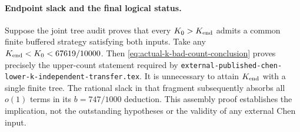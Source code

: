 \paragraph{Endpoint slack and the final logical status.}
Suppose the joint tree audit proves that every $K_0>K_{\rm end}$
admits a common finite buffered strategy satisfying both inputs.
Take any $K_{\rm end}<K_0<67619/10000$. Then
\eqref{eq:actual-k-bad-count-conclusion} proves precisely the
upper-count statement required by
\texttt{external-published-chen-lower-k-independent-transfer.tex}.
It is unnecessary to attain $K_{\rm end}$ with a single finite tree.
The rational slack in that fragment subsequently absorbs all $o(1)$
terms in its $b=747/1000$ deduction. This assembly proof establishes
the implication, not the outstanding hypotheses or the validity of
any external Chen input.
